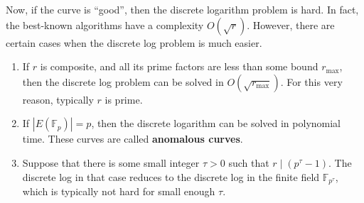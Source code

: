 \documentclass[../lecture-notes.tex]{subfiles}
\begin{document}
Now, if the curve is ``good'', then the discrete logarithm problem is hard. In fact, the best-known algorithms have a complexity $O(\sqrt{r})$. However, there are certain cases when the discrete log problem is much easier.
\begin{enumerate}
    \item If $r$ is composite, and all its prime factors are less than some bound $r_{\max}$, then the discrete log problem can be solved in $O(\sqrt{r_{\max}})$. For this very reason, typically $r$ is prime.
    \item If $|E(\mathbb{F}_p)|=p$, then the discrete logarithm can be solved in polynomial time. These curves are called \textbf{anomalous curves}.
    \item Suppose that there is some small integer $\tau>0$ such that $r \mid (p^{\tau}-1)$. The discrete log in that case reduces to the discrete log in the finite field $\mathbb{F}_{p^{\tau}}$, which is typically not hard for small enough $\tau$.
\end{enumerate}
\end{document}
